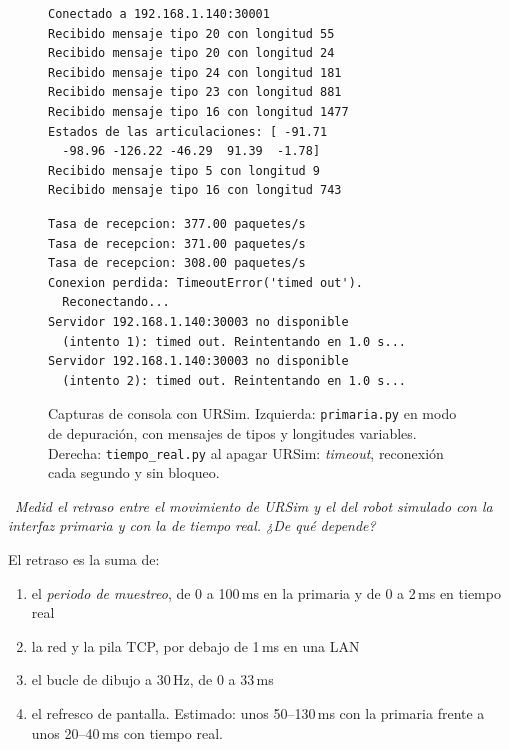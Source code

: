 \documentclass[10pt,a4paper]{article}
\newcommand{\code}[1]{\texttt{\small #1}}
\newcommand{\preg}[2]{\par\smallskip\noindent{\color{azul}\bfseries P#1.}~{\itshape #2}\par\nopagebreak}
\begin{document}
\begin{figure}[h]
\centering
\begin{minipage}[t]{0.47\linewidth}
\begin{lstlisting}[numbers=none,language={},basicstyle=\ttfamily\scriptsize,backgroundcolor=\color{gris}]
Conectado a 192.168.1.140:30001
Recibido mensaje tipo 20 con longitud 55
Recibido mensaje tipo 20 con longitud 24
Recibido mensaje tipo 24 con longitud 181
Recibido mensaje tipo 23 con longitud 881
Recibido mensaje tipo 16 con longitud 1477
Estados de las articulaciones: [ -91.71
  -98.96 -126.22 -46.29  91.39  -1.78]
Recibido mensaje tipo 5 con longitud 9
Recibido mensaje tipo 16 con longitud 743
\end{lstlisting}
\end{minipage}\hfill
\begin{minipage}[t]{0.51\linewidth}
\begin{lstlisting}[numbers=none,language={},basicstyle=\ttfamily\scriptsize,backgroundcolor=\color{gris}]
Tasa de recepcion: 377.00 paquetes/s
Tasa de recepcion: 371.00 paquetes/s
Tasa de recepcion: 308.00 paquetes/s
Conexion perdida: TimeoutError('timed out').
  Reconectando...
Servidor 192.168.1.140:30003 no disponible
  (intento 1): timed out. Reintentando en 1.0 s...
Servidor 192.168.1.140:30003 no disponible
  (intento 2): timed out. Reintentando en 1.0 s...
\end{lstlisting}
\end{minipage}
\caption{Capturas de consola con URSim. Izquierda: \code{primaria.py} en modo de depuración, con mensajes de tipos y longitudes variables. Derecha: \code{tiempo\_real.py} al apagar URSim: \emph{timeout}, reconexión cada segundo y sin bloqueo.}\label{fig:evid}
\end{figure}


\preg{7}{Medid el retraso entre el movimiento de URSim y el del robot simulado con la
interfaz primaria y con la de tiempo real. ¿De qué depende?}
El retraso es la suma de: 
\begin{enumerate}
  \item el \emph{periodo de muestreo}, de 0 a 100\,ms en la primaria y de 0 a 2\,ms en tiempo real
  \item la red y la pila TCP, por debajo de 1\,ms en una LAN
  \item el bucle de dibujo a 30\,Hz, de 0 a 33\,ms
  \item el refresco de pantalla. Estimado: unos 50--130\,ms con la primaria frente a unos 20--40\,ms con tiempo real.
\end{enumerate}
\end{document}
